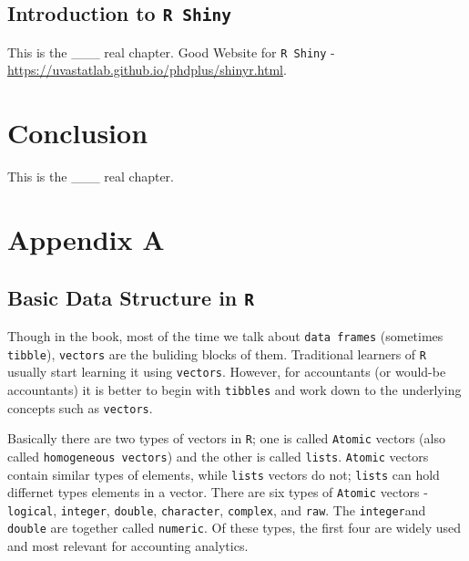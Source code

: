 \documentclass[
]{book}
\begin{document}
\hypertarget{introduction-to-r-shiny}{%
\section{\texorpdfstring{Introduction to \texttt{R\ Shiny}}{Introduction to R Shiny}}\label{introduction-to-r-shiny}}

This is the \_\_\_ real chapter. Good Website for \texttt{R\ Shiny} - \url{https://uvastatlab.github.io/phdplus/shinyr.html}.

\hypertarget{conclusion}{%
\chapter{Conclusion}\label{conclusion}}

This is the \_\_\_ real chapter.

\backmatter

\appendix

\hypertarget{appendix-appendix}{%
\appendix {}}


\hypertarget{appendix-a}{%
\chapter{Appendix A}\label{appendix-a}}

\hypertarget{basic-data-structure-in-r}{%
\section{\texorpdfstring{Basic Data Structure in \texttt{R}}{Basic Data Structure in R}}\label{basic-data-structure-in-r}}

Though in the book, most of the time we talk about \texttt{data\ frames} (sometimes \texttt{tibble}), \texttt{vectors} are the buliding blocks of them. Traditional learners of \texttt{R} usually start learning it using \texttt{vectors}. However, for accountants (or would-be accountants) it is better to begin with \texttt{tibbles} and work down to the underlying concepts such as \texttt{vectors}.

Basically there are two types of vectors in \texttt{R}; one is called \texttt{Atomic} vectors (also called \texttt{homogeneous\ vectors}) and the other is called \texttt{lists}. \texttt{Atomic} vectors contain similar types of elements, while \texttt{lists} vectors do not; \texttt{lists} can hold differnet types elements in a vector. There are six types of \texttt{Atomic} vectors - \texttt{logical}, \texttt{integer}, \texttt{double}, \texttt{character}, \texttt{complex}, and \texttt{raw}. The \texttt{integer}and \texttt{double} are together called \texttt{numeric}. Of these types, the first four are widely used and most relevant for accounting analytics.
\end{document}

